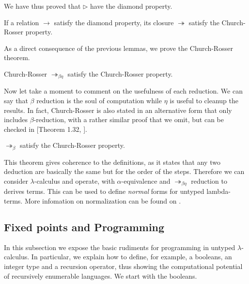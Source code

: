 \begin{remark}
  We have thus proved that $\triangleright$ have the diamond property.
\end{remark}

\begin{remark}
  If a relation $\to$ satisfy the diamond property, its closure $\twoheadrightarrow$ satisfy the Church-Rosser property.
\end{remark}


As a direct consequence of the previous lemmas, we prove the Church-Rosser theorem.
\begin{theorem}{Church-Rosser}
  $\twoheadrightarrow_{\beta\eta}$ satisfy the Church-Rosser property.
\end{theorem}

Now let take a moment to comment on the usefulness of each reduction. We can say that $\beta$ reduction is the soul of computation  while $\eta$ is useful to cleanup the results. In fact, Church-Rosser is also stated in an alternative form that only includes $\beta$-reduction, with a rather similar proof that we omit, but can be checked in [Theorem 1.32, \cite{hindley2008lambda}].

\begin{theorem}
  $\twoheadrightarrow_{\beta}$ satisfy the Church-Rosser property.
\end{theorem}

This theorem gives coherence to the definitions, as it states that any two deduction are basically the same but for the order of the steps. Therefore we can consider $\lambda$-calculus and operate, with $\alpha$-equivalence and $\twoheadrightarrow_{\beta\eta}$ reduction to derives terms. This can be used to define \emph{normal} forms for untyped lambda-terms. More infomation on normalization can be found on \cite{selinger2008lecture}. \\





\subsection{Fixed points and Programming}
In this subsection we expose the basic rudiments for programming in untyped $\lambda$-calculus. In particular, we explain how to define, for example, a booleans, an integer type and a recursion operator, thus showing the computational potential of recursively enumerable languages. We start with the booleans.

